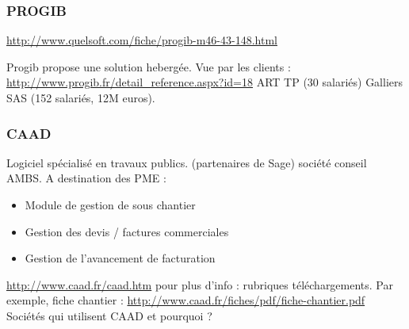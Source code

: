 \subsubsection{PROGIB}
\url{http://www.quelsoft.com/fiche/progib-m46-43-148.html}
 
Progib propose une solution hebergée.
Vue par les clients :
\url{http://www.progib.fr/detail_reference.aspx?id=18} ART TP (30 salariés)
Galliers SAS (152 salariés, 12M euros).

\subsubsection{CAAD}
Logiciel spécialisé en travaux publics. (partenaires de Sage) société conseil AMBS.
A destination des PME :
\begin{itemize}
    \item Module de gestion de sous chantier
    \item Gestion des devis / factures commerciales
    \item Gestion de l'avancement de facturation
\end{itemize}

\url{http://www.caad.fr/caad.htm} pour plus d'info : rubriques téléchargements. Par exemple, fiche chantier : \url{http://www.caad.fr/fiches/pdf/fiche-chantier.pdf}
Sociétés qui utilisent CAAD et pourquoi ?
